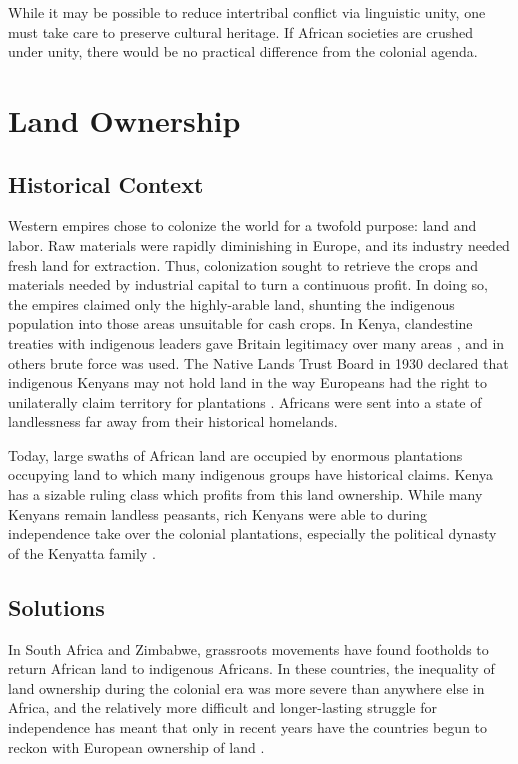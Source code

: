 \documentclass[american]{../../../coursework}
\begin{document}
While it may be possible to reduce intertribal conflict via linguistic unity,
one must take care to preserve cultural heritage. If African societies are
crushed under unity, there would be no practical difference from the colonial
agenda.

\section{Land Ownership}
\subsection{Historical Context}

Western empires chose to colonize the world for a twofold purpose: land and
labor. Raw materials were rapidly diminishing in Europe, and its industry
needed fresh land for extraction. Thus, colonization sought to retrieve the
crops and materials needed by industrial capital to turn a continuous profit.
In doing so, the empires claimed only the highly-arable land, shunting the
indigenous population into those areas unsuitable for cash crops. In Kenya,
clandestine treaties with indigenous leaders gave Britain legitimacy over many
areas \parencite{Rutten1992}, and in others brute force was used. The Native
Lands Trust Board in 1930 declared that indigenous Kenyans may not hold land
in the way Europeans had the right to unilaterally claim territory for
plantations \parencite{Syagga2006}. Africans were sent into a state of
landlessness far away from their historical homelands.

Today, large swaths of African land are occupied by enormous plantations
occupying land to which many indigenous groups have historical claims. Kenya
has a sizable ruling class which profits from this land ownership. While many
Kenyans remain landless peasants, rich Kenyans were able to during
independence take over the colonial plantations, especially the political
dynasty of the Kenyatta family \parencite{Syagga2006}.

\subsection{Solutions}

In South Africa and Zimbabwe, grassroots movements have found footholds to
return African land to indigenous Africans. In these countries, the inequality
of land ownership during the colonial era was more severe than anywhere else
in Africa, and the relatively more difficult and longer-lasting struggle for
independence has meant that only in recent years have the countries begun to
reckon with European ownership of land \parencite{Syagga2006}.
\end{document}
